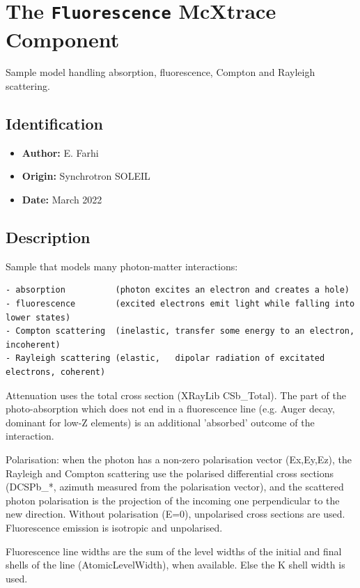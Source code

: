 \section{The \texttt{Fluorescence} McXtrace Component}
Sample model handling absorption, fluorescence, Compton and Rayleigh scattering.

\subsection*{Identification}
\begin{itemize}
  \item \textbf{Author:} E. Farhi
  \item \textbf{Origin:} Synchrotron SOLEIL
  \item \textbf{Date:} March 2022
\end{itemize}

\subsection*{Description}
Sample that models many photon-matter interactions:

\begin{verbatim}
- absorption          (photon excites an electron and creates a hole)
- fluorescence        (excited electrons emit light while falling into lower states)
- Compton scattering  (inelastic, transfer some energy to an electron,    incoherent)
- Rayleigh scattering (elastic,   dipolar radiation of excitated electrons, coherent)
\end{verbatim}

Attenuation uses the total cross section (XRayLib CSb\_Total). The part of the photo-absorption which does not end in a fluorescence line (e.g. Auger decay, dominant for low-Z elements) is an additional 'absorbed' outcome of the interaction.

Polarisation: when the photon has a non-zero polarisation vector (Ex,Ey,Ez), the Rayleigh and Compton scattering use the polarised differential cross sections (DCSPb\_*, azimuth measured from the polarisation vector), and the scattered photon polarisation is the projection of the incoming one perpendicular to the new direction. Without polarisation (E=0), unpolarised cross sections are used. Fluorescence emission is isotropic and unpolarised.

Fluorescence line widths are the sum of the level widths of the initial and final shells of the line (AtomicLevelWidth), when available. Else the K shell width is used.

